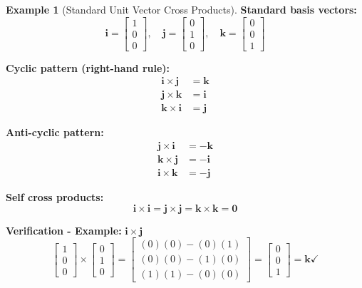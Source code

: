 \documentclass[12pt,a4paper]{article}
\theoremstyle{definition}
\newtheorem{example}{Example}[section]
\begin{document}
\begin{example}[Standard Unit Vector Cross Products]
\textbf{Standard basis vectors:}
\begin{equation}
\mathbf{i} = \begin{bmatrix} 1 \\ 0 \\ 0 \end{bmatrix}, \quad
\mathbf{j} = \begin{bmatrix} 0 \\ 1 \\ 0 \end{bmatrix}, \quad
\mathbf{k} = \begin{bmatrix} 0 \\ 0 \\ 1 \end{bmatrix}
\end{equation}

\textbf{Cyclic pattern (right-hand rule):}
\begin{align}
\mathbf{i} \times \mathbf{j} &= \mathbf{k} \\
\mathbf{j} \times \mathbf{k} &= \mathbf{i} \\
\mathbf{k} \times \mathbf{i} &= \mathbf{j}
\end{align}

\textbf{Anti-cyclic pattern:}
\begin{align}
\mathbf{j} \times \mathbf{i} &= -\mathbf{k} \\
\mathbf{k} \times \mathbf{j} &= -\mathbf{i} \\
\mathbf{i} \times \mathbf{k} &= -\mathbf{j}
\end{align}

\textbf{Self cross products:}
\begin{equation}
\mathbf{i} \times \mathbf{i} = \mathbf{j} \times \mathbf{j} = \mathbf{k} \times \mathbf{k} = \mathbf{0}
\end{equation}

\textbf{Verification - Example:} $\mathbf{i} \times \mathbf{j}$
\begin{equation}
\begin{bmatrix} 1 \\ 0 \\ 0 \end{bmatrix} \times \begin{bmatrix} 0 \\ 1 \\ 0 \end{bmatrix} = \begin{bmatrix}
(0)(0) - (0)(1) \\
(0)(0) - (1)(0) \\
(1)(1) - (0)(0)
\end{bmatrix} = \begin{bmatrix} 0 \\ 0 \\ 1 \end{bmatrix} = \mathbf{k} \checkmark
\end{equation}
\end{example}
\end{document}
